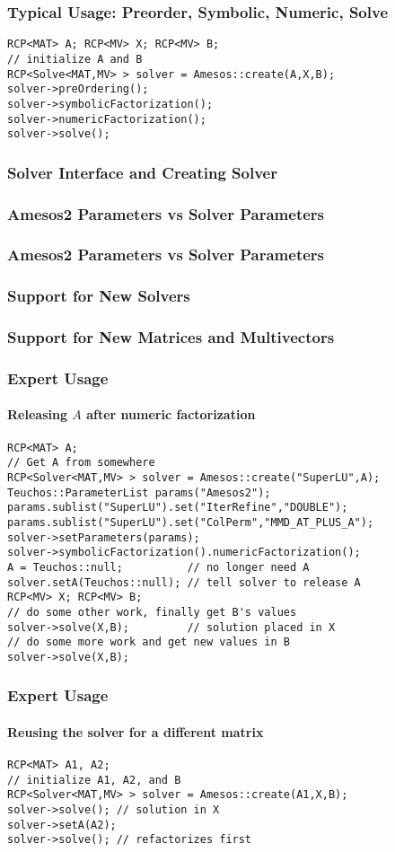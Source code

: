 \documentclass[xcolor=dvipsnames]{beamer}
\begin{document}
\begin{frame}[fragile]
  \frametitle{Typical Usage: Preorder, Symbolic, Numeric, Solve}
  \begin{lstlisting}
RCP<MAT> A; RCP<MV> X; RCP<MV> B;
// initialize A and B
RCP<Solve<MAT,MV> > solver = Amesos::create(A,X,B);
solver->preOrdering();
solver->symbolicFactorization();
solver->numericFactorization();
solver->solve();
  \end{lstlisting}
\end{frame}

\begin{frame}
  \frametitle{Solver Interface and Creating Solver}
\end{frame}

\begin{frame}
  \frametitle{Amesos2 Parameters vs Solver Parameters}
\end{frame}

\begin{frame}
  \frametitle{Amesos2 Parameters vs Solver Parameters}
\end{frame}

\begin{frame}
  \frametitle{Support for New Solvers}
\end{frame}

\begin{frame}
  \frametitle{Support for New Matrices and Multivectors}
\end{frame}

\begin{frame}[fragile]
  \frametitle{Expert Usage}
  \framesubtitle{Releasing $A$ after numeric factorization}
  \begin{lstlisting}
RCP<MAT> A;
// Get A from somewhere
RCP<Solver<MAT,MV> > solver = Amesos::create("SuperLU",A);
Teuchos::ParameterList params("Amesos2");
params.sublist("SuperLU").set("IterRefine","DOUBLE");
params.sublist("SuperLU").set("ColPerm","MMD_AT_PLUS_A");
solver->setParameters(params);
solver->symbolicFactorization().numericFactorization();
A = Teuchos::null;          // no longer need A
solver.setA(Teuchos::null); // tell solver to release A
RCP<MV> X; RCP<MV> B;
// do some other work, finally get B's values
solver->solve(X,B);         // solution placed in X
// do some more work and get new values in B
solver->solve(X,B);
  \end{lstlisting}
\end{frame}

\begin{frame}[fragile]
  \frametitle{Expert Usage}
  \framesubtitle{Reusing the solver for a different matrix}
  \begin{lstlisting}
RCP<MAT> A1, A2;
// initialize A1, A2, and B
RCP<Solver<MAT,MV> > solver = Amesos::create(A1,X,B);
solver->solve(); // solution in X
solver->setA(A2);
solver->solve(); // refactorizes first
  \end{lstlisting}
\end{frame}
\end{document}
